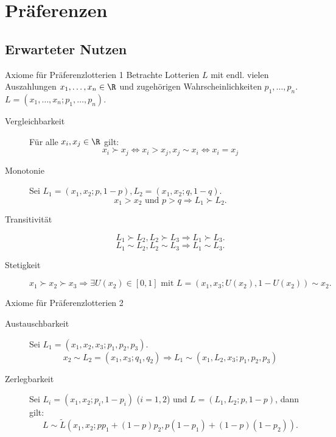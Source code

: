 \section{Präferenzen}

\subsection{}
\subsection{Erwarteter Nutzen}

\begin{karte}{Axiome für Präferenzlotterien 1}
Betrachte Lotterien \(L\) mit endl. vielen Auszahlungen \(x_1, \ldots, x_n \in \R\) 
und zugehörigen Wahrscheinlichkeiten \(p_1, \ldots, p_n\). \(L = (x_1, \ldots, x_n; p_1, \ldots, p_n)\).
\begin{description}
    \item[Vergleichbarkeit] Für alle \(x_i, x_j \in \R\) gilt: 
    \[ x_i \succ x_j \Leftrightarrow x_i > x_j, x_j \sim x_i \Leftrightarrow x_i = x_j \]
    \item[Monotonie] Sei \(L_1 = (x_1, x_2; p, 1-p), L_2 = (x_1, x_2; q, 1-q)\). 
    \[ x_1 > x_2 \text{ und } p > q \Rightarrow L_1 \succ L_2. \]
    \item[Transitivität] 
    \[ L_1 \succ L_2, L_2 \succ L_3 \Rightarrow L_1 \succ L_3. \]
    \[ L_1 \sim L_2, L_2 \sim L_3 \Rightarrow L_1 \sim L_3. \]
    \item[Stetigkeit] \[ x_1\succ x_2 \succ x_3 \Rightarrow \exists U(x_2) \in [0,1] \text{ mit } L = (x_1, x_3; U(x_2), 1-U(x_2)) \sim x_2. \]
\end{description}
\end{karte}

\begin{karte}{Axiome für Präferenzlotterien 2}
\begin{description}
    \item[Austauschbarkeit] Sei \(L_1 = (x_1, x_2, x_3; p_1, p_2, p_3)\). 
    \[ x_2 \sim L_2 = (x_1, x_3; q_1, q_2) \Rightarrow L_1 \sim (x_1, L_2, x_3; p_1, p_2, p_3) \]
    \item[Zerlegbarkeit] Sei \(L_i = (x_1, x_2; p_i, 1-p_i)\) (\(i=1,2\)) und \(L = (L_1, L_2; p, 1-p)\), dann gilt: 
    \[ L \sim \tilde{L}(x_1, x_2; p p_1 + (1-p)p_2, p(1-p_1) + (1-p)(1-p_2)). \]
\end{description}
\end{karte}

